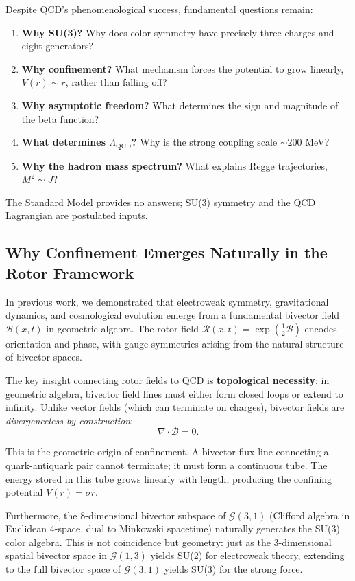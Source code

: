\documentclass[11pt,a4paper]{article}
\newcommand{\Rotor}{\mathcal{R}}
\newcommand{\Biv}{\mathcal{B}}
\newcommand{\Cl}{\mathcal{G}}
\newcommand{\D}{\nabla}
\theoremstyle{definition}
\theoremstyle{plain}
\theoremstyle{remark}
\begin{document}
Despite QCD's phenomenological success, fundamental questions remain:
\begin{enumerate}[leftmargin=*,itemsep=3pt]
  \item \textbf{Why SU(3)?} Why does color symmetry have precisely three charges and eight generators?
  \item \textbf{Why confinement?} What mechanism forces the potential to grow linearly, $V(r) \sim r$, rather than falling off?
  \item \textbf{Why asymptotic freedom?} What determines the sign and magnitude of the beta function?
  \item \textbf{What determines $\Lambda_{\mathrm{QCD}}$?} Why is the strong coupling scale $\sim 200$ MeV?
  \item \textbf{Why the hadron mass spectrum?} What explains Regge trajectories, $M^2 \sim J$?
\end{enumerate}

The Standard Model provides no answers; SU(3) symmetry and the QCD Lagrangian are postulated inputs.

\subsection{Why Confinement Emerges Naturally in the Rotor Framework}

In previous work, we demonstrated that electroweak symmetry, gravitational dynamics, and cosmological evolution emerge from a fundamental bivector field $\Biv(x,t)$ in geometric algebra. The rotor field $\Rotor(x,t) = \exp(\frac{1}{2}\Biv)$ encodes orientation and phase, with gauge symmetries arising from the natural structure of bivector spaces.

The key insight connecting rotor fields to QCD is \textbf{topological necessity}: in geometric algebra, bivector field lines must either form closed loops or extend to infinity. Unlike vector fields (which can terminate on charges), bivector fields are \emph{divergenceless by construction}:
\begin{equation}
\D \cdot \Biv = 0.
\label{eq:divergenceless}
\end{equation}

This is the geometric origin of confinement. A bivector flux line connecting a quark-antiquark pair cannot terminate; it must form a continuous tube. The energy stored in this tube grows linearly with length, producing the confining potential $V(r) = \sigma r$.

Furthermore, the 8-dimensional bivector subspace of $\Cl(3,1)$ (Clifford algebra in Euclidean 4-space, dual to Minkowski spacetime) naturally generates the SU(3) color algebra. This is not coincidence but geometry: just as the 3-dimensional spatial bivector space in $\Cl(1,3)$ yields SU(2) for electroweak theory, extending to the full bivector space of $\Cl(3,1)$ yields SU(3) for the strong force.
\end{document}
